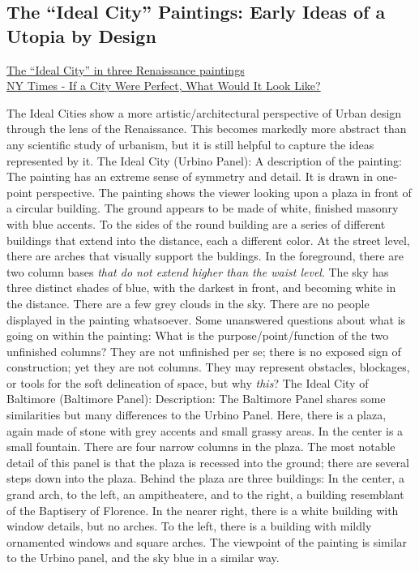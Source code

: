 \documentclass{article}
\begin{document}
        \subsection{The ``Ideal City'' Paintings: Early Ideas of a Utopia by Design}
        \small{\href{https://www.archiobjects.org/the-ideal-city-in-three-renaissance-paintings/}{The “Ideal City” in three Renaissance paintings}}\\
        \small{\href{https://www.nytimes.com/2012/05/09/arts/09iht-conway09.html}{NY Times - If a City Were Perfect, What Would It Look Like?}}
        \normalsize 
        \begin{outline}
            \1 The Ideal Cities show a more artistic/architectural perspective of Urban design through the lens of the Renaissance. 
            \1 This becomes markedly more abstract than any scientific study of urbanism, but it is still helpful to capture the ideas represented by it. 
            \1 The Ideal City (Urbino Panel):
                \2 A description of the painting: The painting has an extreme sense of symmetry and detail. It is drawn in one-point perspective. The painting shows the viewer looking upon a plaza in front of a circular building. The ground appears to be made of white, finished masonry with blue accents. To the sides of the round building are a series of different buildings that extend into the distance, each a different color. At the street level, there are arches that visually support the buldings. In the foreground, there are two column bases \textit{that do not extend higher than the waist level}. The sky has three distinct shades of blue, with the darkest in front, and becoming white in the distance. There are a few grey clouds in the sky. There are no people displayed in the painting whatsoever. 
                \2 Some unanswered questions about what is going on within the painting: 
                    \3 What is the purpose/point/function of the two unfinished columns? They are not unfinished per se; there is no exposed sign of construction; yet they are not columns. They may represent obstacles, blockages, or tools for the soft delineation of space, but why \textit{this}?
            \1 The Ideal City of Baltimore (Baltimore Panel):
                \2 Description: The Baltimore Panel shares some similarities but many differences to the Urbino Panel. Here, there is a plaza, again made of stone with grey accents and small grassy areas. In the center is a small fountain. There are four narrow columns in the plaza. The most notable detail of this panel is that the plaza is recessed into the ground; there are several steps down into the plaza. Behind the plaza are three buildings: In the center, a grand arch, to the left, an ampitheatere, and to the right, a building resemblant of the Baptisery of Florence. In the nearer right, there is a white building with window details, but no arches. To the left, there is a building with mildly ornamented windows and square arches. The viewpoint of the painting is similar to the Urbino panel, and the sky blue in a similar way. 

\end{outline}
\end{document}
